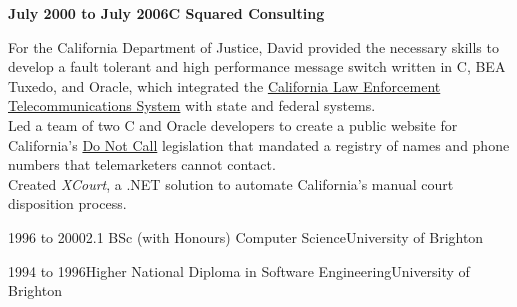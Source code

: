 \documentclass[a4paper,12pt]{article}
\newcommand{\head}[1]{\begin{center}{\large{\textbf{\sc{#1}}}}\nopagebreak\end{center}}
\newcommand{\jobheld}[2]{\textbf{#1\hfill #2}\nopagebreak}
\newcommand{\tab}{\hspace{2em}}
\newcommand{\education}[3]{#1\tab#2\hfill#3}
\begin{document}
\jobheld{July 2000 to July 2006}{C Squared Consulting}

For the California Department of Justice, David provided the necessary skills to develop a fault tolerant and high performance message switch written in C, BEA Tuxedo, and Oracle, which integrated the \href{http://definitions.uslegal.com/c/clets/}{California Law Enforcement Telecommunications System} with state and federal systems.\\

Led a team of two C and Oracle developers to create a public website for California's \href{http://www.sfgate.com/cgi-bin/article.cgi?f=/c/a/2003/03/31/MN5478.DTL}{Do Not Call} legislation that mandated a registry of names and phone numbers that telemarketers cannot contact.\\

Created \emph{XCourt}, a .NET solution to automate California's manual court disposition process.\\

\head{Education}

\education{1996 to 2000}{2.1 BSc (with Honours) Computer Science}{University of Brighton}

\education{1994 to 1996}{Higher National Diploma in Software Engineering}{University of Brighton}
\end{document}

